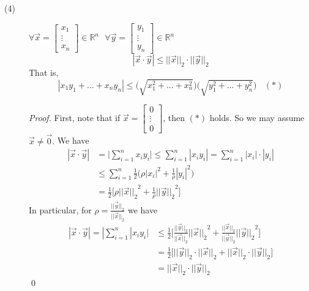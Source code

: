\begin{description}
    \item[(4)]
    $\forall \overrightarrow{x} = \begin{bmatrix} x_1 \\ \vdots \\ x_n \end{bmatrix} \in \mathbb{R}^n ~~~ \forall \overrightarrow{y} = \begin{bmatrix} y_1 \\ \vdots \\ y_n \end{bmatrix} \in \mathbb{R}^n$ 
    $$|\overrightarrow{x} \cdot \overrightarrow{y}| \leq ||\overrightarrow{x}||_2\cdot||\overrightarrow{y}||_2$$
    That is, $$|x_1y_1+...+x_ny_n| \leq \big(\sqrt{x_1^2+...+x_n^2}\big)\big(\sqrt{y_1^2+...+y_n^2}\big) ~~~~ (*)$$
    \begin{proof}
    First, note that if $\overrightarrow{x} = \begin{bmatrix} 0 \\ \vdots \\ 0 \end{bmatrix}$, then $(*)$ holds. So we may assume $\overrightarrow{x} \not = \overrightarrow{0}.$ We have
    \begin{align*}
        |\overrightarrow{x} \cdot \overrightarrow{y}| &= \big| \sum \limits_{i=1}^nx_iy_i\big| \leq \sum \limits_{i=1}^n |x_iy_i| = \sum \limits_{i=1}^n|x_i|\cdot |y_i| \\ &\leq \sum \limits_{i=1}^n \frac{1}{2}\big(\rho |x_i|^2 + \frac{1}{\rho}|y_i|^2\big) \\ &=\frac{1}{2}\big[\rho ||{\overrightarrow{x}||_2}^2 + \frac{1}{\rho} {||\overrightarrow{y}||_2}^2\big]
    \end{align*}
    In particular, for $\rho= \frac{||\overrightarrow{y}||_2}{||\overrightarrow{x}||_2}$ we have 
    \begin{align*} |\overrightarrow{x} \cdot \overrightarrow{y}| = |\sum \limits_{i=1}^n |x_iy_i| &\leq \frac{1}{2} \big[\frac{||\overrightarrow{y}||_2}{||\overrightarrow{x}||_2} {||\overrightarrow{x}||_2}^2 + \frac{||\overrightarrow{x}||_2}{||\overrightarrow{y}||_2} {||\overrightarrow{y}||_2}^2\big] \\ &= \frac{1}{2} \big[||\overrightarrow{y}||_2 \cdot||\overrightarrow{x}||_2+||\overrightarrow{x}||_2 \cdot ||\overrightarrow{y}||_2\big] \\ &=||\overrightarrow{x}||_2 \cdot ||\overrightarrow{y}||_2 \end{align*} \qed
    \end{proof}
\end{description}

